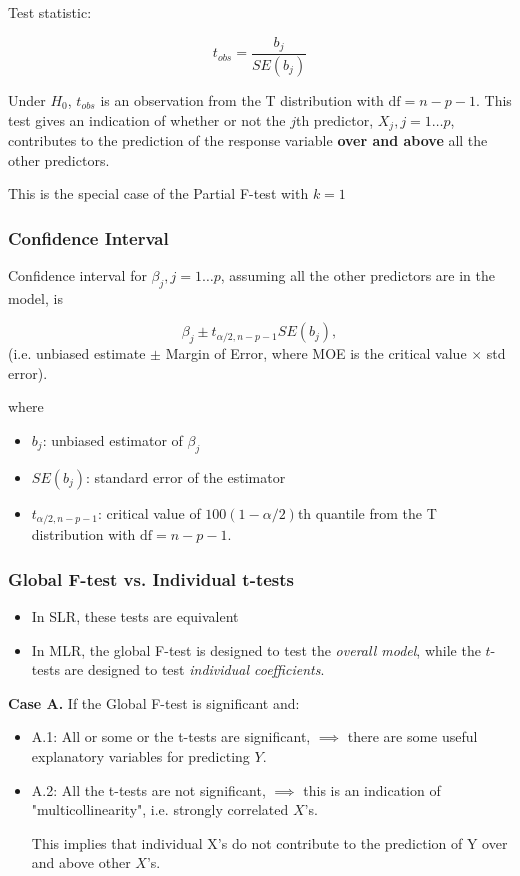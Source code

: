 \documentclass[11pt]{article}
\theoremstyle{definition}
\numberwithin{equation}{section}
\begin{document}
Test statistic:

\begin{equation}
  t_{obs} = \frac{b_j}{SE(b_j)}
\end{equation}

Under $H_0$, $t_{obs}$ is an observation from the T distribution with $\text{df}=n-p-1$. This test gives an indication of whether or not the $j$th predictor, $X_j,j=1\dots p$, contributes to the prediction of the response variable \textbf{over and above} all the other predictors.

This is the special case of the Partial F-test with $k=1$

\subsubsection{Confidence Interval}

Confidence interval for $\beta_j, j=1\dots p$, assuming all the other predictors are in the model, is

\begin{equation}
  \beta_j \pm t_{\alpha/2, n-p-1}SE(b_j),
\end{equation}
(i.e. unbiased estimate $\pm$ Margin of Error, where MOE is the critical value $\times$ std error).

where
\begin{itemize}
  \item $b_j$: unbiased estimator of $\beta_j$
  \item $SE(b_j)$: standard error of the estimator
  \item $t_{\alpha/2, n-p-1}$: critical value of $100(1-\alpha/2)$th quantile from the T distribution with $\text{df}=n-p-1$.
\end{itemize}

\subsubsection{Global F-test vs. Individual t-tests}
\begin{itemize}
\item In SLR, these tests are equivalent
\item In MLR, the global F-test is designed to test the \textit{overall model}, while the $t$-tests are designed to test \textit{individual coefficients}.
\end{itemize}

\textbf{Case A.} If the Global F-test is significant and:
\begin{itemize}
\item A.1: All or some or the t-tests are significant, $\implies$ there are some useful explanatory variables for predicting $Y$.
\item A.2: All the t-tests are not significant, $\implies$ this is an indication of "multicollinearity", i.e. strongly correlated $X$'s.

This implies that individual X's do not contribute to the prediction of Y over and above other $X$'s.
\end{itemize}
\end{document}
